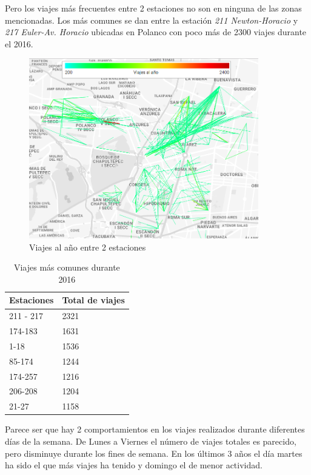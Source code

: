 \documentclass[12pt,spanish]{article}
\begin{document}
	Pero los viajes más frecuentes entre 2 estaciones no son en ninguna de las zonas mencionadas. Los más comunes se dan entre la estación \textit{211 Newton-Horacio} y \textit{217 Euler-Av. Horacio} ubicadas en Polanco con poco más de 2300 viajes durante el 2016.\\
	\begin{figure}[H]
		\centering
		\includegraphics[width=10cm]{Imagenes/viajes_mas_comunes.png}
		\begin{centering}
			\caption{Viajes al año entre 2 estaciones}
		\end{centering}
	\end{figure}
	\begin{table}[H]
		\centering
		\caption{Viajes más comunes durante 2016}
		\label{my-label}
	\begin{tabular}{ | l | l |}
		Estaciones & Total de viajes \\ \hline
		211 - 217 & 2321 \\ \hline
		174-183 & 1631 \\ \hline
		1-18 & 1536 \\ \hline
		85-174 & 1244 \\ \hline
		174-257 & 1216 \\ \hline
		206-208 & 1204 \\ \hline
		21-27 & 1158 \\ \hline
	\end{tabular}
	\end{table}
	\pagebreak
	Parece ser que hay 2 comportamientos en los viajes realizados durante diferentes días de la semana. De Lunes a Viernes el número de viajes totales es parecido, pero disminuye durante los fines de semana. En los últimos 3 años el día martes ha sido el que más viajes ha tenido y domingo el de menor actividad.
\end{document}
